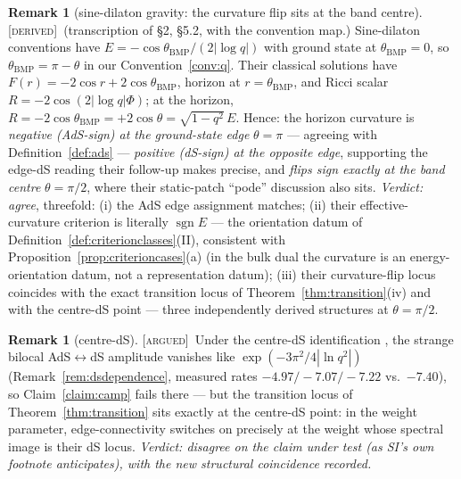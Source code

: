 \documentclass[11pt,a4paper]{article}
\newcommand{\DERIVED}{{\color{teal}\textsc{[derived]}}}
\newcommand{\ARGUED}{{\color{orange}\textsc{[argued]}}}
\theoremstyle{definition}
\newtheorem{remark}[definition]{Remark}
\theoremstyle{plain}
\begin{document}
\begin{remark}[sine-dilaton gravity: the curvature flip sits at the band centre]
\label{rem:sinedilatoncheck}
\DERIVED\ (transcription of \cite{Blommaert:2024sinedilaton} \S2, \S5.2, with the
convention map.) Sine-dilaton conventions have $E=-\cos\theta_{\mathrm{BMP}}/(2|\log q|)$
with ground state at $\theta_{\mathrm{BMP}}=0$, so
$\theta_{\mathrm{BMP}}=\pi-\theta$ in our Convention~\ref{conv:q}. Their classical
solutions have $F(r)=-2\cos r+2\cos\theta_{\mathrm{BMP}}$, horizon at
$r=\theta_{\mathrm{BMP}}$, and Ricci scalar $R=-2\cos(2|\log q|\Phi)$; at the horizon,
$R=-2\cos\theta_{\mathrm{BMP}}=+2\cos\theta=\sqrt{1-q^{2}}\,E$. Hence: the horizon
curvature is \emph{negative (AdS-sign) at the ground-state edge} $\theta=\pi$ ---
agreeing with Definition~\ref{def:ads} --- \emph{positive (dS-sign) at the opposite edge},
supporting the edge-dS reading their follow-up \cite{Blommaert:2024entropic} makes
precise, and \emph{flips sign exactly at the band centre} $\theta=\pi/2$, where their
static-patch ``pode'' discussion also sits. \emph{Verdict: agree}, threefold: (i) the
AdS edge assignment matches; (ii) their effective-curvature criterion is literally
$\operatorname{sgn}E$ --- the orientation datum of
Definition~\ref{def:criterionclasses}(II), consistent with
Proposition~\ref{prop:criterioncases}(a) (in the bulk dual the curvature is an
energy-orientation datum, not a representation datum); (iii) their curvature-flip locus
coincides with the exact transition locus of Theorem~\ref{thm:transition}(iv) and with
the centre-dS point --- three independently derived structures at $\theta=\pi/2$.
\end{remark}

\begin{remark}[centre-dS]\label{rem:centredscheck}
\ARGUED\ Under the centre-dS identification \cite{Narovlansky:2023lfz}, the strange
bilocal AdS$\leftrightarrow$dS amplitude vanishes like $\exp(-3\pi^{2}/4|\ln q^{2}|)$
(Remark~\ref{rem:dsdependence}, measured rates $-4.97/-7.07/-7.22$ vs.\ $-7.40$), so
Claim~\ref{claim:camp} fails there --- but the transition locus of
Theorem~\ref{thm:transition} sits exactly at the centre-dS point: in the weight
parameter, edge-connectivity switches on precisely at the weight whose spectral image is
their dS locus. \emph{Verdict: disagree on the claim under test (as SI's own footnote
anticipates), with the new structural coincidence recorded.}
\end{remark}
\end{document}
